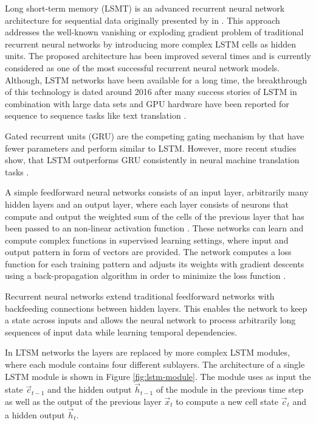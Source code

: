 Long short-term memory (LSMT) is an advanced recurrent neural network architecture for sequential data originally presented by \citeauthor{DBLP:journals/neco/HochreiterS97} in \citeyear{DBLP:journals/neco/HochreiterS97} \cite{DBLP:journals/neco/HochreiterS97}.
This approach addresses the well-known vanishing or exploding gradient problem \cite{DBLP:conf/icml/PascanuMB13}  of traditional recurrent neural networks by introducing more complex LSTM cells as hidden units.
The proposed architecture has been improved several times \cite{DBLP:journals/neco/GersSC00} \cite {DBLP:journals/tnn/GreffSKSS17} and is currently considered as one of the most successful recurrent neural network models.
Although, LSTM networks have been available for a long time, the breakthrough of this technology is dated around 2016 after many success stories of LSTM in combination with large data sets and GPU hardware have been reported for sequence to sequence tasks like text translation \cite{DBLP:journals/corr/WuSCLNMKCGMKSJL16}.

Gated recurrent units (GRU) \cite{DBLP:conf/emnlp/ChoMGBBSB14} are the competing gating mechanism by \citeauthor{DBLP:conf/emnlp/ChoMGBBSB14} that have fewer parameters and perform similar to LSTM.
However, more recent studies show, that LSTM outperforms GRU consistently in neural machine translation tasks \cite{DBLP:journals/corr/BritzGLL17}.

A simple feedforward neural networks consists of an input layer, arbitrarily many hidden layers and an output layer, where each layer consists of neurons that compute and output the weighted sum of the cells of the previous layer that has been passed to an non-linear activation function \cite{DBLP:journals/nn/Schmidhuber15}.
These networks can learn and compute complex functions in supervised learning settings, where input and output pattern in form of vectors are provided.
The network computes a loss function for each training pattern and adjusts its weights with gradient descents using a back-propagation algorithm in order to minimize the loss function \cite{rumelhart1986learning}.

Recurrent neural networks extend traditional feedforward networks with backfeeding connections between hidden layers.
This enables the network to keep a state across inputs and allows the neural network to process arbitrarily long sequences of input data while learning temporal dependencies.

In LTSM networks the layers are replaced by more complex LSTM modules, where each module contains four different sublayers.
The architecture of a single LSTM module is shown in Figure \ref{fig:lstm-module}.
The module uses as input the state $\vec{c}_{t-1}$ and the hidden output $\vec{h}_{t-1}$ of the module in the previous time step as well as the output of the previous layer $\vec{x}_t$ to compute a new cell state $\vec{c}_{t}$ and a hidden output $\vec{h}_{t}$.


